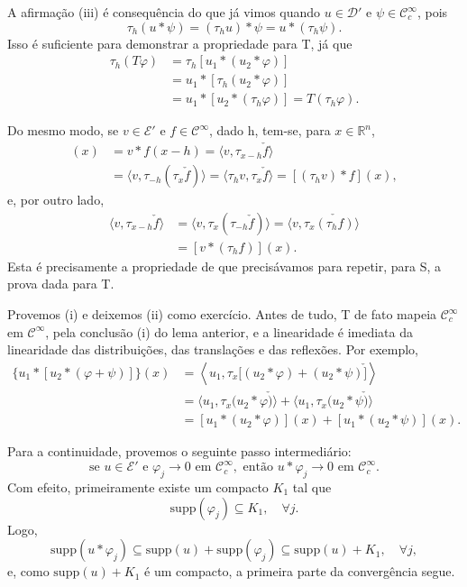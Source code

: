 \documentclass[../distribution_theory_notes.tex]{subfiles}
\begin{document}
\begin{proof*}
	A afirmação (iii) é consequência do que já vimos quando \(u\in \mathcal{D}'\) e \(\psi\in \mathcal{C}_{c}^{\infty}\), pois
	\[
		\tau_{h}(u*\psi)=(\tau_{h}u)*\psi=u*(\tau_{h}\psi).
	\]
	Isso é suficiente para demonstrar a propriedade para T, já que
	\begin{align*}
		\tau_{h}(T\varphi)
		 & =\tau_{h}[u_{1}*(u_{2}*\varphi)] \\
		 & =u_{1}*[\tau_{h}(u_{2}*\varphi)] \\
		 & =u_{1}*[u_{2}*(\tau_{h}\varphi)]
		=T(\tau_{h}\varphi).
	\end{align*}

	Do mesmo modo, se \(v\in \mathcal{E}'\) e \(f\in \mathcal{C}^{\infty}\), dado h, tem-se, para \(x\in \mathbb{R}^{n}\),
	\begin{align*}
		[\tau_{h}(v*f)](x)
		 & =v*f(x-h)
		=\langle v,\tau_{x-h}\check f\rangle             \\
		 & =\langle v,\tau_{-h}(\tau_{x}\check f)\rangle
		=\langle \tau_{h}v,\tau_{x}\check f\rangle
		=[(\tau_{h}v)*f](x),
	\end{align*}
	e, por outro lado,
	\begin{align*}
		\langle v,\tau_{x-h}\check f\rangle
		 & =\langle v,\tau_{x}(\tau_{-h}\check f)\rangle
		=\langle v,\tau_{x}\check{(\tau_{h}f)}\rangle    \\
		 & =[v*(\tau_{h}f)](x).
	\end{align*}
	Esta é precisamente a propriedade de que precisávamos para repetir, para S, a prova dada para T.

	Provemos (i) e deixemos (ii) como exercício. Antes de tudo, T de fato mapeia \(\mathcal{C}_{c}^{\infty}\) em \(\mathcal{C}^{\infty}\), pela conclusão (i) do lema anterior, e a linearidade é imediata da linearidade das distribuições, das translações e das reflexões. Por exemplo,
	\begin{align*}
		\bigl\{u_{1}*[u_{2}*(\varphi+\psi)]\bigr\}(x)
		 & =\left\langle u_{1},\tau_{x}\bigl[(u_{2}*\varphi)+(u_{2}*\psi)\check{\bigr]}\right\rangle \\
		 & =\langle u_{1},\tau_{x}(u_{2}*\varphi\check{)}\rangle
		+\langle u_{1},\tau_{x}(u_{2}*\psi\check{)}\rangle                                           \\
		 & =[u_{1}*(u_{2}*\varphi)](x)+[u_{1}*(u_{2}*\psi)](x).
	\end{align*}

	Para a continuidade, provemos o seguinte passo intermediário:
	\[
		\text{se }u\in \mathcal{E}'\text{ e }\varphi_{j}\longrightarrow 0\text{ em }\mathcal{C}_{c}^{\infty},
		\text{ então }u*\varphi_{j}\longrightarrow 0\text{ em }\mathcal{C}_{c}^{\infty}.
	\]
	Com efeito, primeiramente existe um compacto \(K_{1}\) tal que
	\[
		\mathrm{supp}(\varphi_{j})\subseteq K_{1},\quad \forall j.
	\]
	Logo,
	\[
		\mathrm{supp}(u*\varphi_{j})
		\subseteq \mathrm{supp}(u)+\mathrm{supp}(\varphi_{j})
		\subseteq \mathrm{supp}(u)+K_{1},\quad \forall j,
	\]
	e, como \(\mathrm{supp}(u)+K_{1}\) é um compacto, a primeira parte da convergência segue.


\end{proof*}
\end{document}
